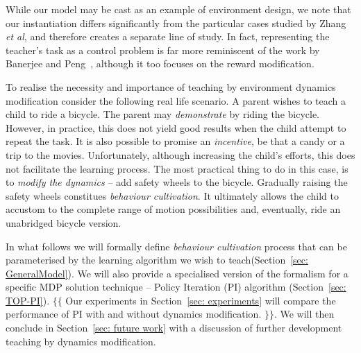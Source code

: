 While our model may be cast as an example of environment design, we
note that our instantiation differs significantly from the particular
cases studied by Zhang \emph{et al}, and therefore creates a separate
line of study. In fact, representing the teacher's task as a control
problem is far more reminiscent of the work by Banerjee and
Peng~\cite{banerjee_peng_2005}, although it too focuses on the reward
modification.

To realise the necessity and importance of teaching by environment
dynamics modification consider the following real life scenario. A
parent wishes to teach a child to ride a bicycle. The parent may {\em
  demonstrate} by riding the bicycle. However, in practice, this does
not yield good results when the child attempt to repeat the task. It
is also possible to promise an {\em incentive}, be that a candy or a
trip to the movies. Unfortunately, although increasing the child's
efforts, this does not facilitate the learning process. The most
practical thing to do in this case, is to {\em modify the dynamics} --
add safety wheels to the bicycle. Gradually raising the safety wheels
constitues {\em behaviour cultivation}. It ultimately allows the child
to accustom to the complete range of motion possibilities and,
eventually, ride an unabridged bicycle version.

In what follows we will formally define {\em behaviour cultivation}
process that can be parameterised by the learning algorithm we wish to
teach(Section~\ref{sec: GeneralModel}).
We will also provide a specialised
version of the formalism for a specific MDP solution technique --
Policy Iteration (PI) algorithm (Section~\ref{sec: TOP-PI}). $\{\{$
Our experiments in Section~\ref{sec: experiments} will compare the
performance of PI with and without dynamics modification. $\}\}$. We
will then conclude in Section~\ref{sec: future work} with a discussion
of further development teaching by dynamics modification.

